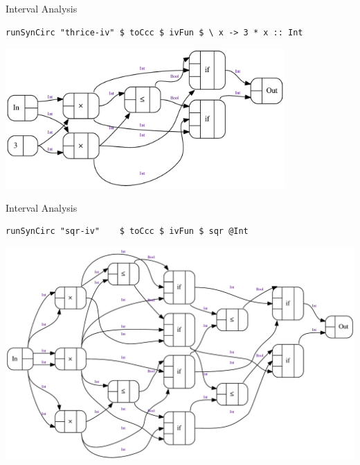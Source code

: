 \documentclass[10pt]{beamer}
\theoremstyle{definition}
\theoremstyle{remark}
\numberwithin{equation}{section}
\begin{document}
\begin{frame}[fragile]{Interval Analysis}
  \begin{lstlisting}[frame=single]
     runSynCirc "thrice-iv" $ toCcc $ ivFun $ \ x -> 3 * x :: Int
  \end{lstlisting}
  \begin{center}
    \includegraphics[width=0.8\textwidth]{thrice-iv.pdf}
  \end{center}
\end{frame}

\begin{frame}[fragile]{Interval Analysis}
  \begin{lstlisting}[frame=single]
    runSynCirc "sqr-iv"    $ toCcc $ ivFun $ sqr @Int
  \end{lstlisting}
  \begin{center}
    \includegraphics[width=1.0\textwidth]{sqr-iv.pdf}
  \end{center}
\end{frame}
\end{document}
